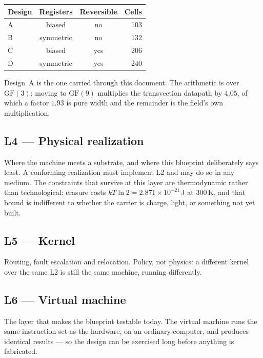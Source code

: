 \begin{center}
\small
\begin{tabular}{@{}l c c r@{}}
\toprule
\textbf{Design} & \textbf{Registers} & \textbf{Reversible} & \textbf{Cells} \\
\midrule
A & biased     & no  & 103 \\
B & symmetric  & no  & 132 \\
C & biased     & yes & 206 \\
D & symmetric  & yes & 240 \\
\bottomrule
\end{tabular}
\end{center}

\noindent Design~A is the one carried through this document. The arithmetic is over
$\mathrm{GF}(3)$; moving to $\mathrm{GF}(9)$ multiplies the transvection datapath by
$4.05$, of which a factor $1.93$ is pure width and the remainder is the field's own
multiplication.

\subsection{L4 --- Physical realization}

Where the machine meets a substrate, and where this blueprint deliberately says least. A
conforming realization must implement L2 and may do so in any medium. The constraints that
survive at this layer are thermodynamic rather than technological: erasure costs
$kT\ln 2 = 2.871\times10^{-21}$\,J at 300\,K, and that bound is indifferent to whether the
carrier is charge, light, or something not yet built.

\subsection{L5 --- Kernel}

Routing, fault escalation and relocation. Policy, not physics: a different kernel over the
same L2 is still the same machine, running differently.

\subsection{L6 --- Virtual machine}

\begin{plainbox}
The layer that makes the blueprint testable today. The virtual machine runs the same
instruction set as the hardware, on an ordinary computer, and produces identical results ---
so the design can be exercised long before anything is fabricated.
\end{plainbox}

